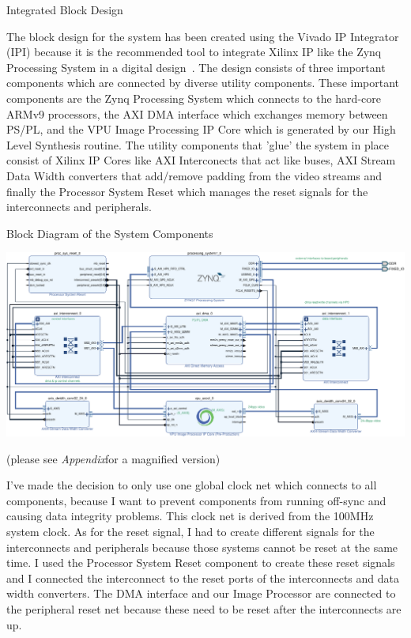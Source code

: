 \documentclass{matthijs}
\begin{document}
	\begin{hoofdstuk}{Integrated Block Design}

		The block design for the system has been created using the Vivado IP Integrator (IPI) because it is the recommended tool to integrate Xilinx IP like the Zynq Processing System in a digital design~\cite{xilinxug994}.
		The design consists of three important components which are connected by diverse utility components.
		These important components are the Zynq Processing System which connects to the hard-core ARMv9 processors, the AXI DMA interface which exchanges memory between PS/PL, and the VPU Image Processing IP Core which is generated by our High Level Synthesis routine.
		The utility components that 'glue' the system in place consist of Xilinx IP Cores like AXI Interconects that act like buses, AXI Stream Data Width converters that add/remove padding from the video streams and finally the Processor System Reset which manages the reset signals for the interconnects and peripherals.

		\begin{figuur}{Block Diagram of the System Components}
			
			\vspace{1cm}
			\centerline{\includegraphics[width=1.2\textwidth]{hw-block-diagram-crop-asset.pdf}}
			\vspace{0.5cm}
			(please see \textit{Appendix}for a magnified version)

		\end{figuur}

		I've made the decision to only use one global clock net which connects to all components, because I want to prevent components from running off-sync and causing data integrity problems.
		This clock net is derived from the 100MHz system clock.
		As for the reset signal, I had to create different signals for the interconnects and peripherals because those systems cannot be reset at the same time.
		I used the Processor System Reset component to create these reset signals and I connected the interconnect to the reset ports of the interconnects and data width converters.
		The DMA interface and our Image Processor are connected to the peripheral reset net because these need to be reset after the interconnects are up.


\end{hoofdstuk}
\end{document}
